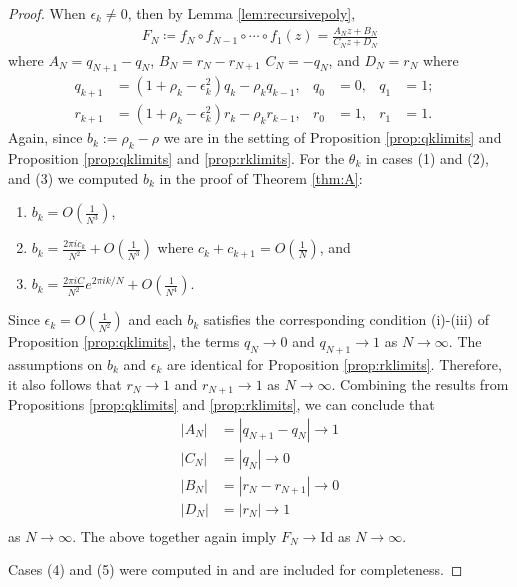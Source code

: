 \documentclass{amsart}
\theoremstyle{remark}
\theoremstyle{definition}
\newcommand{\lp}{\left(}
\newcommand{\rp}{\right)}
\begin{document}
\begin{proof}
    When $\epsilon_{k} \neq 0$, then by Lemma \ref{lem:recursivepoly}, 
	\begin{align*}
	F_{N}\coloneqq f_N\circ f_{N-1} \circ \cdots \circ f_1(z) = \frac{A_N z +B_N }{C_N z + D_N}
	\end{align*}
where $A_N = q_{N+1}-q_N$, $B_N = r_{N}-r_{N+1}$ $C_N=-q_N$, and $D_N = r_N$ where
\begin{align*}
q_{k+1} &= (1+\rho_k-\epsilon_k^2) q_k-\rho_k q_{k-1}, & q_0&=0, & q_1&=1;& \\
r_{k+1} &= (1+\rho_k-\epsilon_k^2) r_k-\rho_k r_{k-1}, & r_0&=1, & r_1&=1.&
\end{align*}	
Again, since $b_k:= \rho_k-\rho$ we are in the setting of Proposition \ref{prop:qklimits} and Proposition \ref{prop:qklimits} and \ref{prop:rklimits}. 
For the $\theta_{k}$ in cases (1) and (2), and (3) we computed $b_{k}$ in the proof of Theorem \ref{thm:A}: 
\begin{enumerate}
   \item $\displaystyle{b_{k}=O\lp\frac{1}{N^{3}}\rp}$,
   \item $\displaystyle{b_{k} = \frac{2\pi i c_{k}}{N^2} + O\left(\frac{1}{N^{3}}\right)}$ where $\displaystyle{c_k+c_{k+1}=O\lp\frac{1}{N}\rp}$, and
   \item $\displaystyle{b_k =\frac{2\pi iC}{N^2}e^{2\pi ik/N} + O\left(\frac{1}{N^{4}}\right)}$. 
\end{enumerate}
Since $\epsilon_{k} =O\lp \frac{1}{N^2}\rp$ and each $b_k$ satisfies the corresponding condition (i)-(iii) of Proposition \ref{prop:qklimits}, the terms $q_N \to 0$ and $q_{N+1} \to 1$ as $N \to \infty$. 
The assumptions on $b_{k}$ and $\epsilon_{k}$ are identical for Proposition \ref{prop:rklimits}. Therefore, it also follows that $r_N\rightarrow 1$ and $r_{N+1}\rightarrow 1$ as $N \to \infty$.
Combining the results from Propositions \ref{prop:qklimits} and \ref{prop:rklimits}, we can conclude that
\begin{align*}
 |A_N| &= |q_{N+1}-q_N| \rightarrow 1 \\ 
 |C_N| &= |q_N| \rightarrow 0 \\ 
 |B_N| &= |r_{N}-r_{N+1}| \rightarrow 0 \\ 
 |D_N| &= |r_N| \rightarrow 1 \\ 
\end{align*}  
as $N\rightarrow\infty$. 
The above together again imply $F_{N}\rightarrow \text{Id}$ as $N\rightarrow \infty.$ 

Cases (4) and (5) were computed in \cite{Viv20} and are included for completeness.
\end{proof}	
\end{document}
